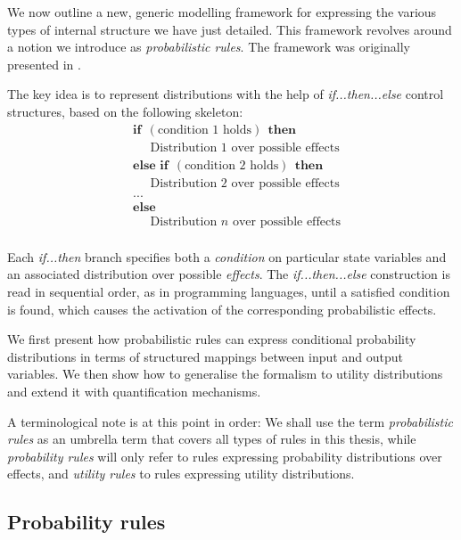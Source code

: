We now outline a new, generic modelling framework for expressing the various types of internal structure we have just detailed.  This framework revolves around a notion we introduce as \textit{probabilistic rules}. The framework was originally presented in \cite{rulebasedmodels-sigdial2012,lison-semdial2012}.

The key idea is to represent distributions with the help of \textit{if...then...else} control structures, based on the following skeleton:
\begin{equation*}
\begin{aligned}
& \textbf{if} \ \ (\text{condition 1 holds}) \ \ \textbf{then} \\ 
& \;\;\;\;\; \text{Distribution 1 over possible effects} \\
& \textbf{else if} \ \ (\text{condition 2 holds}) \ \ \textbf{then} \\ 
& \;\;\;\;\; \text{Distribution 2 over possible effects} \\
& ... \\
& \textbf{else} \\
& \;\;\;\;\; \text{Distribution } n \text{ over possible effects} \\ 
\end{aligned}
\end{equation*}

Each \textit{if...then} branch specifies both a \textit{condition} on particular state variables and an associated distribution over possible \textit{effects}.   The \textit{if...then...else} construction is read in sequential order, as in programming languages, until a satisfied condition is found, which causes the activation of the corresponding probabilistic effects. 

We first present how probabilistic rules can express conditional probability distributions in terms of structured mappings between input and output variables.  We then show how to  generalise the formalism to utility distributions and extend it with quantification mechanisms.

A terminological note is at this point in order: We shall use the term \textit{probabilistic rules} as an umbrella term that covers all types of rules in this thesis, while \textit{probability rules} will only refer to rules expressing probability distributions over effects, and \textit{utility rules} to rules expressing utility distributions.

\subsection{Probability rules}
\label{sec:probabirules}

